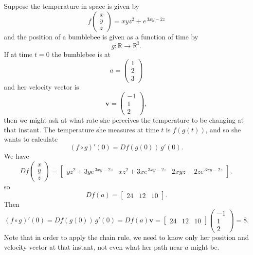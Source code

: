 \begin{example}
Suppose the temperature in space is given by
\[
f\!\begin{pmatrix}x\\y\\z\end{pmatrix}
= xyz^{2}+e^{\,3xy-2z}
\]
and the position of a bumblebee is given as a function of time by
\[
g:\mathbb{R}\to\mathbb{R}^{3}.
\]
If at time \(t=0\) the bumblebee is at
\[
a=\begin{pmatrix}1\\2\\3\end{pmatrix}
\]
and her velocity vector is
\[
\mathbf{v}=\begin{pmatrix}-1\\1\\2\end{pmatrix},
\]
then we might ask at what rate she
perceives the temperature to be changing at that instant. The temperature she
measures at time \(t\) is \(f(g(t))\), and so she wants to calculate
\[
(f\circ g)'(0)=Df(g(0))\,g'(0).
\]
We have
\[
Df\!\begin{pmatrix}x\\y\\z\end{pmatrix}
=
\begin{bmatrix}
yz^{2}+3ye^{\,3xy-2z}
&
xz^{2}+3xe^{\,3xy-2z}
&
2xyz-2ze^{\,3xy-2z}
\end{bmatrix},
\]
so
\[
Df(a)=\begin{bmatrix}24&12&10\end{bmatrix}.
\]
Then
\[
(f\circ g)'(0)=Df(g(0))\,g'(0)=Df(a)\mathbf{v}
=
\begin{bmatrix}24&12&10\end{bmatrix}
\begin{pmatrix}-1\\1\\2\end{pmatrix}
=8.
\]
Note that in order to apply the chain rule, we need to know only her position
and velocity vector at that instant, not even what her path near \(a\) might be.
\end{example}